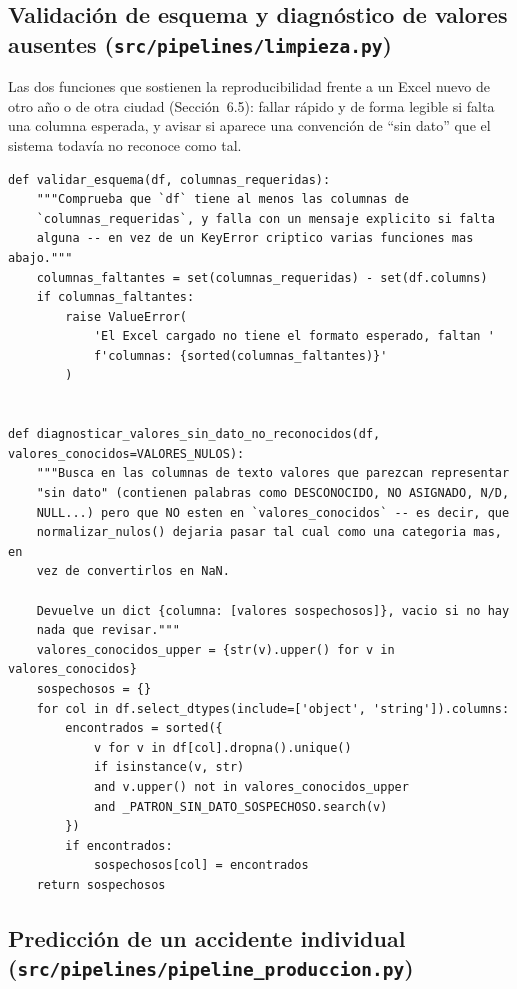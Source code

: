 \documentclass[11pt,a4paper]{article}
\begin{document}
\subsection{Validación de esquema y diagnóstico de valores ausentes (\texttt{src/pipelines/limpieza.py})}
\label{app:validacion_esquema}

Las dos funciones que sostienen la reproducibilidad frente a un Excel nuevo de otro año o de otra ciudad (Sección~6.5): fallar rápido y de forma legible si falta una columna esperada, y avisar si aparece una convención de ``sin dato'' que el sistema todavía no reconoce como tal.

\begin{lstlisting}[caption={Validación de esquema y diagnóstico de valores ``sin dato'' no reconocidos.}]
def validar_esquema(df, columnas_requeridas):
    """Comprueba que `df` tiene al menos las columnas de
    `columnas_requeridas`, y falla con un mensaje explicito si falta
    alguna -- en vez de un KeyError criptico varias funciones mas abajo."""
    columnas_faltantes = set(columnas_requeridas) - set(df.columns)
    if columnas_faltantes:
        raise ValueError(
            'El Excel cargado no tiene el formato esperado, faltan '
            f'columnas: {sorted(columnas_faltantes)}'
        )


def diagnosticar_valores_sin_dato_no_reconocidos(df, valores_conocidos=VALORES_NULOS):
    """Busca en las columnas de texto valores que parezcan representar
    "sin dato" (contienen palabras como DESCONOCIDO, NO ASIGNADO, N/D,
    NULL...) pero que NO esten en `valores_conocidos` -- es decir, que
    normalizar_nulos() dejaria pasar tal cual como una categoria mas, en
    vez de convertirlos en NaN.

    Devuelve un dict {columna: [valores sospechosos]}, vacio si no hay
    nada que revisar."""
    valores_conocidos_upper = {str(v).upper() for v in valores_conocidos}
    sospechosos = {}
    for col in df.select_dtypes(include=['object', 'string']).columns:
        encontrados = sorted({
            v for v in df[col].dropna().unique()
            if isinstance(v, str)
            and v.upper() not in valores_conocidos_upper
            and _PATRON_SIN_DATO_SOSPECHOSO.search(v)
        })
        if encontrados:
            sospechosos[col] = encontrados
    return sospechosos
\end{lstlisting}

\subsection{Predicción de un accidente individual (\texttt{src/pipelines/pipeline\_produccion.py})}
\label{app:predecir_individual}
\end{document}
